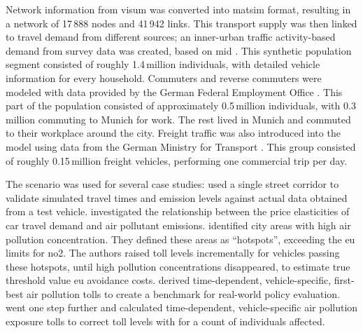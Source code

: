 Network information from \acrshort{visum} was converted into \gls{matsim} format, resulting in a network of 17\,888 nodes and 41\,942 links.
%
This transport supply was then linked to travel demand from different sources; an inner-urban traffic activity-based demand from survey data was created, based on \gls{mid} \citep[MiD 2002,][]{FollmerEtAl_TechRep_infasDIW_2004}. This synthetic population segment consisted of roughly 1.4\,million individuals, with detailed vehicle information for every household.
%
Commuters and reverse commuters were modeled with data provided by the German Federal Employment Office \citep{BoehmeEigenhueller_TechRep_IAB_2006}. This part of the population consisted of approximately 0.5\,million individuals, with  0.3\,million commuting to Munich for work. The rest lived in Munich and commuted to their workplace around the city.
%
Freight traffic was also introduced into the model using data from the German Ministry for Transport \citep{ITBBVU_TechRep_2007}. This group consisted of roughly 0.15\,million freight vehicles, performing one commercial trip per day.

The scenario was used for several case studies:
%
\citet{HuelsmannEtAl_LAS_2011} used a single street corridor to validate simulated travel times and emission levels against actual data obtained from a test vehicle.
%
\citet{KickhoeferEtAl_VanoutriveVerhetsel_2013} investigated the relationship between the price elasticities of car travel demand and air pollutant emissions.
%
\citet{HuelsmannEtAl_GerikeEtAl_2013} identified city areas with high air pollution concentration. They defined these areas as ``hotspots'', exceeding the \gls{eu} limits for \gls{no2}. The authors raised toll levels incrementally for vehicles passing these hotspots, until high pollution concentrations disappeared, to estimate true threshold value \gls{eu} avoidance costs.
%
\citet{KickhoeferNagel2012EmissionInternalization} derived time-dependent, vehicle-specific, first-best air pollution tolls to create a benchmark for real-world policy evaluation.
%
\citet{KickhoeferKern_MobilTUM_2014} went one step further and calculated time-dependent, vehicle-specific air pollution exposure tolls to correct toll levels with \citet{KickhoeferNagel2012EmissionInternalization} for a count of individuals affected.



